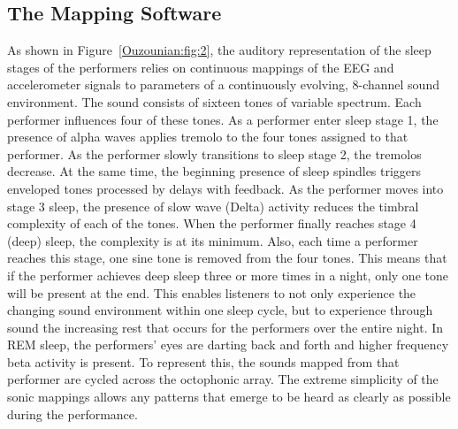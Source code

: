\subsection{The Mapping Software}

As shown in Figure~\ref{Ouzounian:fig:2}, the auditory representation of the sleep stages
of the performers relies on continuous mappings of the EEG and accelerometer
signals to parameters of a continuously evolving, 8-channel sound environment. 
The\textit{ }sound consists of sixteen tones of variable spectrum.  Each
performer influences four of these tones.  As a performer enter sleep stage 1,
the presence of alpha waves applies tremolo to the four tones assigned to that
performer.  As the performer slowly transitions to sleep stage 2, the tremolos
decrease.  At the same time, the beginning presence of sleep spindles triggers
enveloped tones processed by delays with feedback.  As the performer moves into
stage 3 sleep, the presence of slow wave (Delta) activity reduces the timbral
complexity of each of the tones.  When the performer finally reaches stage 4
(deep) sleep, the complexity is at its minimum.  Also, each time a performer
reaches this stage, one sine tone is removed from the four tones.  This means
that if the performer achieves deep sleep three or more times in a night, only
one tone will be present at the end.  This enables listeners to not only
experience the changing sound environment within one sleep cycle, but to
experience through sound the increasing rest that occurs for the performers over
the entire night.  In REM sleep, the performers' eyes are darting back and forth
and higher frequency beta activity is present. To represent this, the sounds
mapped from that performer are cycled across the octophonic array.  The extreme
simplicity of the sonic mappings allows any patterns that emerge to be heard as
clearly as possible during the performance.

